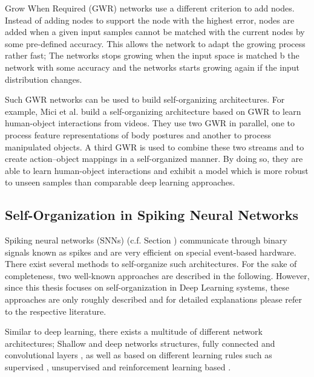 Grow When Required (GWR) networks  use a different criterion to add nodes.
Instead of adding nodes to support the node with the highest error, nodes are added when a given input samples cannot be matched with the current nodes by some pre-defined accuracy.
This allows the network to adapt the growing process rather fast; The networks stops growing when the input space is matched b the network with some accuracy and the networks starts growing again if the input distribution changes.

Such GWR networks can be used to build self-organizing architectures.
For example, Mici et al.  build a self-organizing architecture based on GWR to learn human-object interactions from videos.
They use two GWR in parallel, one to process feature representations of body postures and another to process manipulated objects.
A third GWR is used to combine these two streams and to create action–object mappings in a self-organized manner.
By doing so, they are able to learn human-object interactions and exhibit a model which is more robust to unseen samples than comparable deep learning approaches.


\subsection{Self-Organization in Spiking Neural Networks}
Spiking neural networks (SNNs) (c.f. Section ) communicate through binary signals known as spikes and are very efficient on special event-based hardware.
There exist several methods to self-organize such architectures.
For the sake of completeness, two well-known approaches are described in the following.
However, since this thesis focuses on self-organization in Deep Learning systems, these approaches are only roughly described and for detailed explanations please refer to the respective literature.

Similar to deep learning, there exists a multitude of different network architectures; Shallow  and deep networks  structures, fully connected  and convolutional layers , as well as based on different learning rules such as supervised , unsupervised  and reinforcement learning based .


